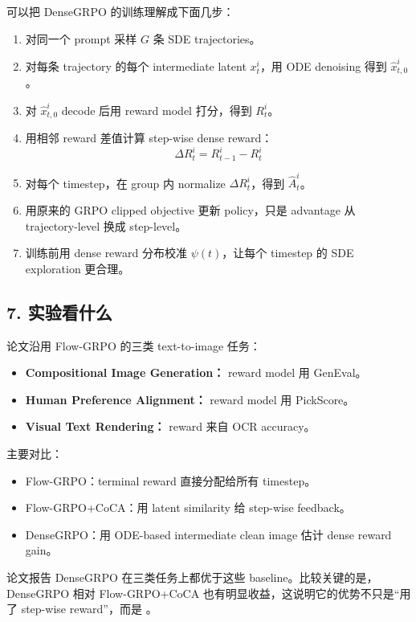 可以把 DenseGRPO 的训练理解成下面几步：

\begin{enumerate}[leftmargin=1.5em]
  \item 对同一个 prompt 采样 \(G\) 条 SDE trajectories。
  \item 对每条 trajectory 的每个 intermediate latent \(x^i_t\)，用 ODE denoising 得到 \(\hat{x}^i_{t,0}\)。
  \item 对 \(\hat{x}^i_{t,0}\) decode 后用 reward model 打分，得到 \(R^i_t\)。
  \item 用相邻 reward 差值计算 step-wise dense reward：
  \[
  \Delta R^i_t = R^i_{t-1} - R^i_t
  \]
  \item 对每个 timestep，在 group 内 normalize \(\Delta R^i_t\)，得到 \(\hat{A}^i_t\)。
  \item 用原来的 GRPO clipped objective 更新 policy，只是 advantage 从 trajectory-level 换成 step-level。
  \item 训练前用 dense reward 分布校准 \(\psi(t)\)，让每个 timestep 的 SDE exploration 更合理。
\end{enumerate}

\subsection{7. 实验看什么}

论文沿用 Flow-GRPO 的三类 text-to-image 任务：

\begin{itemize}[leftmargin=1.5em]
  \item \textbf{Compositional Image Generation：} reward model 用 GenEval。
  \item \textbf{Human Preference Alignment：} reward model 用 PickScore。
  \item \textbf{Visual Text Rendering：} reward 来自 OCR accuracy。
\end{itemize}

主要对比：

\begin{itemize}[leftmargin=1.5em]
  \item Flow-GRPO：terminal reward 直接分配给所有 timestep。
  \item Flow-GRPO+CoCA：用 latent similarity 给 step-wise feedback。
  \item DenseGRPO：用 ODE-based intermediate clean image 估计 dense reward gain。
\end{itemize}

论文报告 DenseGRPO 在三类任务上都优于这些 baseline。比较关键的是，DenseGRPO 相对 Flow-GRPO+CoCA 也有明显收益，这说明它的优势不只是“用了 step-wise reward”，而是 。

